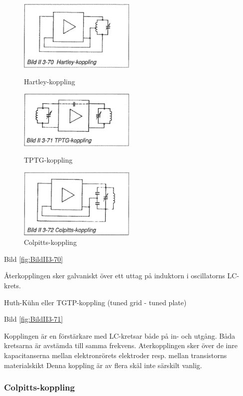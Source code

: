 \begin{figure}
  \includegraphics[width=0.5\textwidth]{images/bild_2_3-70}
  \caption{Hartley-koppling}
  \label{fig:BildII3-70}

  \includegraphics[width=0.5\textwidth]{images/bild_2_3-71}
  \caption{TPTG-koppling}
  \label{fig:BildII3-71}

  \includegraphics[width=0.5\textwidth]{images/bild_2_3-72}
  \caption{Colpitts-koppling}
  \label{fig:BildII3-72}
\end{figure}

Bild \ref{fig:BildII3-70}

Återkopplingen sker galvaniskt över ett uttag på induktorn i
oscillatorns LC-krets.

Huth-Kühn eller TGTP-koppling (tuned grid - tuned plate)

Bild \ref{fig:BildII3-71}

Kopplingen är en förstärkare med LC-kretsar både på in- och
utgång. Båda kretsarna är avstämda till samma frekvens. Aterkopplingen
sker över de inre kapacitanserna mellan elektronrörets elektroder
resp. mellan transistorns materialskikt Denna koppling är av flera
skäl inte särskilt vanlig.

\subsubsection{Colpitts-koppling}


